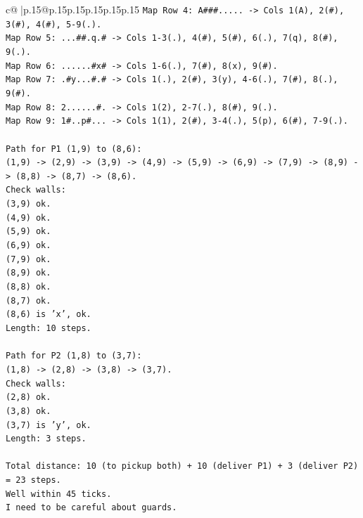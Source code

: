 \documentclass{article}
\begin{document}
{\begin{supertabular}{c@{$\;$}|p{.15\linewidth}@{}p{.15\linewidth}p{.15\linewidth}p{.15\linewidth}p{.15\linewidth}p{.15\linewidth}}
{{{\texttt{Map Row 4: A\#\#\#..... {-}> Cols 1(A), 2(\#), 3(\#), 4(\#), 5{-}9(.).} \\
\texttt{Map Row 5: ...\#\#.q.\# {-}> Cols 1{-}3(.), 4(\#), 5(\#), 6(.), 7(q), 8(\#), 9(.).} \\
\texttt{Map Row 6: ......\#x\# {-}> Cols 1{-}6(.), 7(\#), 8(x), 9(\#).} \\
\texttt{Map Row 7: .\#y...\#.\# {-}> Cols 1(.), 2(\#), 3(y), 4{-}6(.), 7(\#), 8(.), 9(\#).} \\
\texttt{Map Row 8: 2......\#. {-}> Cols 1(2), 2{-}7(.), 8(\#), 9(.).} \\
\texttt{Map Row 9: 1\#..p\#... {-}> Cols 1(1), 2(\#), 3{-}4(.), 5(p), 6(\#), 7{-}9(.).} \\
\\ 
\texttt{Path for P1 (1,9) to (8,6):} \\
\texttt{(1,9) {-}> (2,9) {-}> (3,9) {-}> (4,9) {-}> (5,9) {-}> (6,9) {-}> (7,9) {-}> (8,9) {-}> (8,8) {-}> (8,7) {-}> (8,6).} \\
\texttt{Check walls:} \\
\texttt{(3,9) ok.} \\
\texttt{(4,9) ok.} \\
\texttt{(5,9) ok.} \\
\texttt{(6,9) ok.} \\
\texttt{(7,9) ok.} \\
\texttt{(8,9) ok.} \\
\texttt{(8,8) ok.} \\
\texttt{(8,7) ok.} \\
\texttt{(8,6) is 'x', ok.} \\
\texttt{Length: 10 steps.} \\
\\ 
\texttt{Path for P2 (1,8) to (3,7):} \\
\texttt{(1,8) {-}> (2,8) {-}> (3,8) {-}> (3,7).} \\
\texttt{Check walls:} \\
\texttt{(2,8) ok.} \\
\texttt{(3,8) ok.} \\
\texttt{(3,7) is 'y', ok.} \\
\texttt{Length: 3 steps.} \\
\\ 
\texttt{Total distance: 10 (to pickup both) + 10 (deliver P1) + 3 (deliver P2) = 23 steps.} \\
\texttt{Well within 45 ticks.} \\
\texttt{I need to be careful about guards.} \\
}}}
\end{supertabular}}
\end{document}
